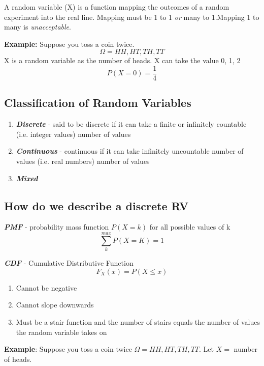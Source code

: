 \documentclass[12pt]{article}
\begin{document}
    A random variable (X) is a function mapping the outcomes of a 
    random experiment into the real line. Mapping must be 1 to 1 
    \textit{or} many to 1.Mapping 1 to many is \textit{unacceptable}.

    \textbf{Example:} Suppose you toss a coin twice. 
    $$\Omega = {HH, HT, TH, TT}$$
    X is a random variable as the number of heads. X can take the 
    value 0, 1, 2
    $$P(X=0) = \frac{1}{4}$$

    \subsection{Classification of Random Variables}

    \begin{enumerate}[label = (\alph*)]
        \item \textit{\textbf{Discrete}} - said to be discrete if it 
        can take a finite or infinitely countable (i.e. integer values) 
        number of values
        \item \textit{\textbf{Continuous}} - continuous if it can take 
        infinitely uncountable number of values (i.e. real numbers) 
        number of values
        \item \textit{\textbf{Mixed}}
    \end{enumerate}

    \subsection{How do we describe a discrete RV}

    \textit{\textbf{PMF}} - probability mass function $P(X=k)$ for 
    all possible values of k 
    $$\sum_{k}^{max}P(X=K) = 1$$

    \textit{\textbf{CDF}} - Cumulative Distributive Function
    $$F_X(x) = P(X \leq x)$$

    \begin{enumerate}[label = \Roman*]
        \item Cannot be negative
        \item Cannot slope downwards
        \item Must be a stair function and the number of stairs equals
        the number of values the random variable takes on
    \end{enumerate}

    \textbf{Example}: Suppose you toss a coin twice
    $\Omega = {HH, HT, TH, TT}$. Let $X =$ number of heads. 
    
\end{document}
